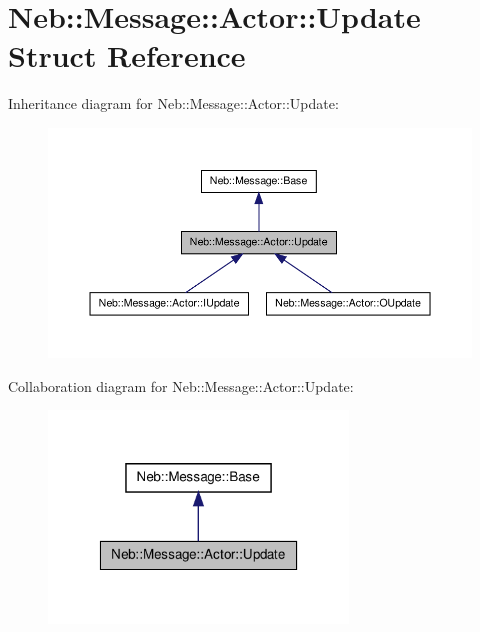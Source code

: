 \hypertarget{structNeb_1_1Message_1_1Actor_1_1Update}{\section{\-Neb\-:\-:\-Message\-:\-:\-Actor\-:\-:\-Update \-Struct \-Reference}
\label{structNeb_1_1Message_1_1Actor_1_1Update}
}


\-Inheritance diagram for \-Neb\-:\-:\-Message\-:\-:\-Actor\-:\-:\-Update\-:\nopagebreak
\begin{figure}[H]
\begin{center}
\leavevmode
\includegraphics[width=350pt]{structNeb_1_1Message_1_1Actor_1_1Update__inherit__graph}
\end{center}
\end{figure}


\-Collaboration diagram for \-Neb\-:\-:\-Message\-:\-:\-Actor\-:\-:\-Update\-:\nopagebreak
\begin{figure}[H]
\begin{center}
\leavevmode
\includegraphics[width=226pt]{structNeb_1_1Message_1_1Actor_1_1Update__coll__graph}
\end{center}
\end{figure}
